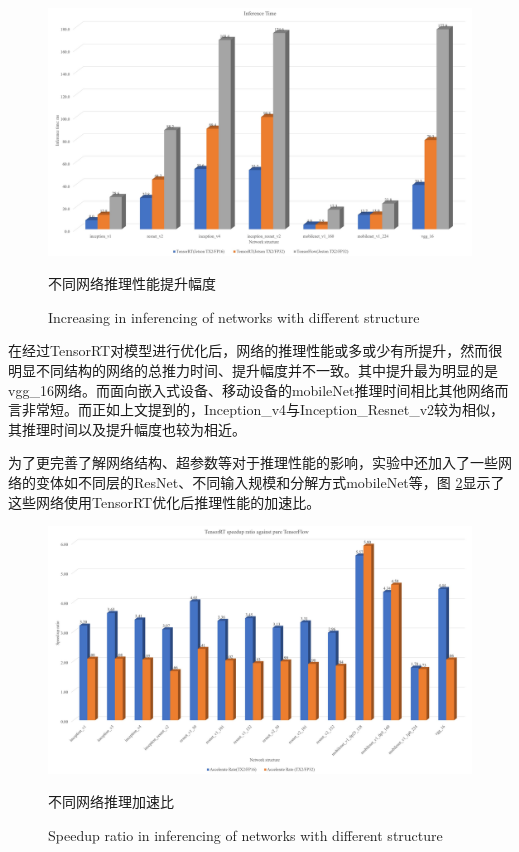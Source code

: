 \begin{figure}
	\centering
	\includegraphics[width=15cm]{figures/TENSORRTRES.jpg}
	\renewcommand{\thefigure}{\arabic{section}-\arabic{figure} }
	\renewcommand{\figurename}{图}
	\caption{不同网络推理性能提升幅度}
	\addtocounter{figure}{-1}
	\renewcommand{\thefigure}{\arabic{section}-\arabic{figure} }
	\renewcommand{\figurename}{Figure}
	\caption{Increasing in inferencing of networks with different structure}
	\label{Fig.INFER}
\end{figure}
\par 在经过TensorRT对模型进行优化后，网络的推理性能或多或少有所提升，然而很明显不同结构的网络的总推力时间、提升幅度并不一致。其中提升最为明显的是vgg\_16网络。而面向嵌入式设备、移动设备的mobileNet推理时间相比其他网络而言非常短。而正如上文提到的，Inception\_v4与Inception\_Resnet\_v2较为相似，其推理时间以及提升幅度也较为相近。
\par 为了更完善了解网络结构、超参数等对于推理性能的影响，实验中还加入了一些网络的变体如不同层的ResNet、不同输入规模和分解方式mobileNet等，图 \ref{Fig.INFERSPEEDUP}显示了这些网络使用TensorRT优化后推理性能的加速比。
\begin{figure}
	\centering
	\includegraphics[width=15cm]{figures/TENSORRTRATIO.jpg}
	\renewcommand{\thefigure}{\arabic{section}-\arabic{figure} }
	\renewcommand{\figurename}{图}
	\caption{不同网络推理加速比}
	\addtocounter{figure}{-1}
	\renewcommand{\thefigure}{\arabic{section}-\arabic{figure} }
	\renewcommand{\figurename}{Figure}
	\caption{Speedup ratio in inferencing of networks with different structure}
	\label{Fig.INFERSPEEDUP}
\end{figure}
